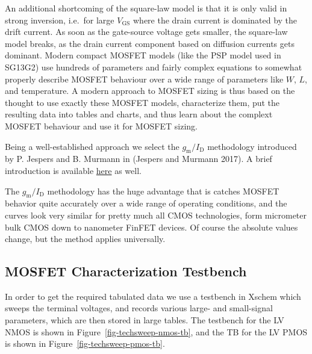 \documentclass[
  a4paper,
  DIV=11,
  numbers=noendperiod]{scrartcl}
\begin{document}
An additional shortcoming of the square-law model is that it is only
valid in strong inversion, i.e.~for large \(V_\mathrm{GS}\) where the
drain current is dominated by the drift current. As soon as the
gate-source voltage gets smaller, the square-law model breaks, as the
drain current component based on diffusion currents gets dominant.
Modern compact MOSFET models (like the PSP model used in SG13G2) use
hundreds of parameters and fairly complex equations to somewhat properly
describe MOSFET behaviour over a wide range of parameters like \(W\),
\(L\), and temperature. A modern approach to MOSFET sizing is thus based
on the thought to use exactly these MOSFET models, characterize them,
put the resulting data into tables and charts, and thus learn about the
complext MOSFET behaviour and use it for MOSFET sizing.

Being a well-established approach we select the
\(g_\mathrm{m}/I_\mathrm{D}\) methodology introduced by P. Jespers and
B. Murmann in (Jespers and Murmann 2017). A brief introduction is
available
\href{https://github.com/iic-jku/analog-circuit-design/blob/main/sizing/Ref_Murmann_gmID.pdf}{here}
as well.

The \(g_\mathrm{m}/I_\mathrm{D}\) methodology has the huge advantage
that is catches MOSFET behavior quite accurately over a wide range of
operating conditions, and the curves look very similar for pretty much
all CMOS technologies, form micrometer bulk CMOS down to nanometer
FinFET devices. Of course the absolute values change, but the method
applies universally.

\subsection{MOSFET Characterization
Testbench}\label{mosfet-characterization-testbench}

In order to get the required tabulated data we use a testbench in Xschem
which sweeps the terminal voltages, and records various large- and
small-signal parameters, which are then stored in large tables. The
testbench for the LV NMOS is shown in
Figure~\ref{fig-techsweep-nmos-tb}, and the TB for the LV PMOS is shown
in Figure~\ref{fig-techsweep-pmos-tb}.
\end{document}
